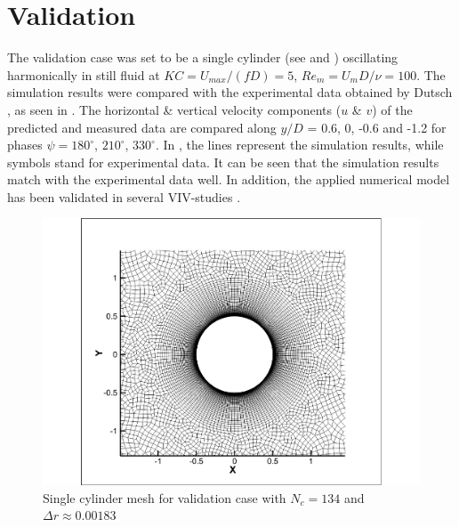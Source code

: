 \section{Validation} \label{sec validation}
The validation case was set to be a single cylinder (see  and ) oscillating harmonically in still fluid at $KC=U_{max}/(fD)=5$, $Re_m=U_mD/\nu =100$. The simulation results were compared with the experimental data obtained by Dutsch \cite{DUTSCH1998}, as seen in . The horizontal \& vertical velocity components ($u$ \& $v$) of the predicted and measured data are compared along $y/D$ = 0.6, 0, -0.6 and -1.2 for phases $\psi =180^{\circ}$, $210^{\circ}$, $330^{\circ}$. In , the lines represent the simulation results, while symbols stand for experimental data. It can be seen that the simulation results match with the experimental data well. In addition, the applied numerical model has been validated in several VIV-studies \cite{Zhao2013,Cui2014,Zhao2014,Zhao2013e}.
\begin{figure}[hb!]
		\centering
		\captionsetup{justification=centering}
		\includegraphics[width=0.40\linewidth]{"Figs/single_cylinder"}
		\caption{Single cylinder mesh for validation case with $ N_c=134 $ and $ \Delta r\approx0.00183 $}
		\label{fig:singlecylinder}
\end{figure}

